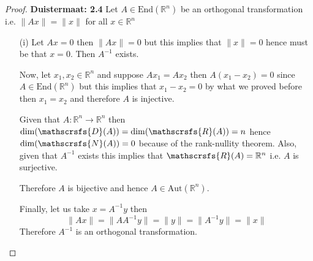 \documentclass[11pt]{article}
\newcommand{\R}{\mathbb{R}}
\newcommand{\End}{\text{End}}
\newcommand{\Aut}{\text{Aut}}
\newcommand{\dom}{\mathscrsfs{D}}
\newcommand{\range}{\mathscrsfs{R}}
\newcommand{\nullsp}{\mathscrsfs{N}}
\theoremstyle{definition}
\begin{document}
\begin{proof}{\textbf{Duistermaat: 2.4}}
    Let $A \in \End(\R^n)$ be an orthogonal transformation i.e.
    $\|Ax\| = \|x\|$ for all $x\in \R^n$
    \begin{itemize}
        \item [(i)] Let $Ax = 0$ then $\|Ax\| = 0$ but this implies that
        $\|x\| = 0$ hence must be that $x = 0$. Then $A^{-1}$ exists.
        
        Now, let $x_1, x_2 \in \R^n$ and suppose $Ax_1 = Ax_2$ then
        $A(x_1 - x_2) = 0$ since $A \in \End(\R^n)$ but this implies that
        $x_1 - x_2 = 0$ by what we proved before then $x_1 = x_2$
        and therefore $A$ is injective.

        Given that $A:\R^n \to \R^n$ then $\dim(\dom(A)) = \dim(\range(A))= n$
        hence $\dim(\nullsp(A)) = 0$ because of the rank-nullity theorem.
        Also, given that $A^{-1}$ exists this implies that $\range(A) = \R^n$
        i.e. $A$ is surjective.
        
        Therefore $A$ is bijective and hence $A \in \Aut(\R^n)$.

        Finally, let us take $x = A^{-1}y$ then
        $$\|Ax\| = \|AA^{-1}y\| = \|y\| = \|A^{-1}y\| = \|x\|$$
        Therefore $A^{-1}$ is an orthogonal transformation.


\end{itemize}
\end{proof}
\end{document}
